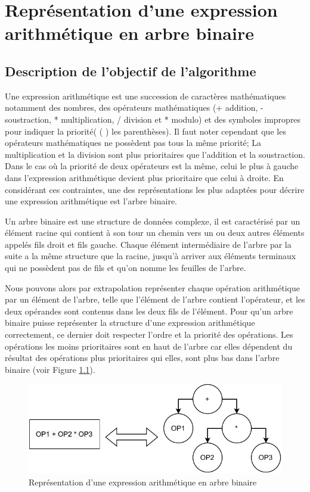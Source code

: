 \chapter{Représentation d'une expression arithmétique en arbre binaire}

\section{Description de l'objectif de l'algorithme}
Une expression arithmétique est une succession de caractères mathématiques notamment des nombres, des opérateurs mathématiques (+ addition, - soustraction, * multiplication, / division et * modulo) et des symboles impropres pour indiquer la priorité( ( ) les parenthèses).
Il faut noter cependant que les opérateurs mathématiques ne possèdent pas tous la même priorité; La multiplication et la division sont plus prioritaires que l'addition et la soustraction.
Dans le cas où la priorité de deux opérateurs est la même, celui le plus à gauche dans l'expression arithmétique devient plus prioritaire que celui à droite.
En considérant ces contraintes, une des représentations les plus adaptées pour décrire une expression arithmétique est l'arbre binaire.
\par
Un arbre binaire est une structure de données complexe, il est caractérisé par un élément racine qui contient à son tour un chemin vers un ou deux autres éléments appelés fils droit et fils gauche. Chaque élément intermédiaire de l'arbre par la suite a la même structure que la racine, jusqu'à arriver aux éléments terminaux qui ne possèdent pas de fils et qu'on nomme les feuilles de l'arbre.
\par
Nous pouvons alors par extrapolation représenter chaque opération arithmétique par un élément de l'arbre, telle que l'élément de l'arbre contient l'opérateur, et les deux opérandes sont contenus dans les deux fils de l'élément.
Pour qu'un arbre binaire puisse représenter la structure d'une expression arithmétique correctement, ce dernier doit respecter l'ordre et la priorité des opérations. Les opérations les moins prioritaires sont en haut de l'arbre car elles dépendent du résultat des opérations plus prioritaires qui elles, sont plus bas dans l'arbre binaire (voir Figure \ref{fig:exp_arbre}).

\begin{figure}[H]
    \centering
        \includegraphics[scale=1.0]{./ressources/expression_to_tree.pdf}
        \caption{Représentation d'une expression arithmétique en arbre binaire}
    \label{fig:exp_arbre}
\end{figure}

